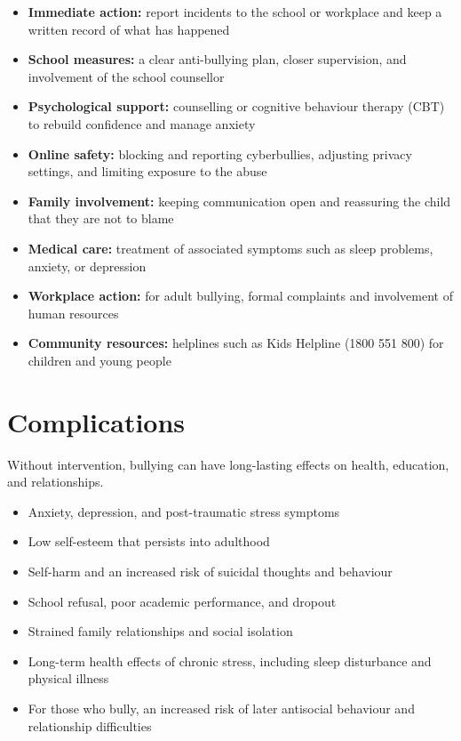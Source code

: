 \begin{itemize}
    \item \textbf{Immediate action:} report incidents to the school or workplace and keep a written record of what has happened
    \item \textbf{School measures:} a clear anti-bullying plan, closer supervision, and involvement of the school counsellor
    \item \textbf{Psychological support:} counselling or cognitive behaviour therapy (CBT) to rebuild confidence and manage anxiety
    \item \textbf{Online safety:} blocking and reporting cyberbullies, adjusting privacy settings, and limiting exposure to the abuse
    \item \textbf{Family involvement:} keeping communication open and reassuring the child that they are not to blame
    \item \textbf{Medical care:} treatment of associated symptoms such as sleep problems, anxiety, or depression
    \item \textbf{Workplace action:} for adult bullying, formal complaints and involvement of human resources
    \item \textbf{Community resources:} helplines such as Kids Helpline (1800 551 800) for children and young people
\end{itemize}

\section*{Complications}
Without intervention, bullying can have long-lasting effects on health, education, and relationships.

\begin{itemize}
    \item Anxiety, depression, and post-traumatic stress symptoms
    \item Low self-esteem that persists into adulthood
    \item Self-harm and an increased risk of suicidal thoughts and behaviour
    \item School refusal, poor academic performance, and dropout
    \item Strained family relationships and social isolation
    \item Long-term health effects of chronic stress, including sleep disturbance and physical illness
    \item For those who bully, an increased risk of later antisocial behaviour and relationship difficulties
\end{itemize}

